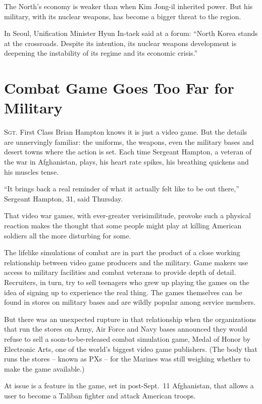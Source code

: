 ﻿\documentclass[12pt]{article}
\begin{document}
The North's economy is weaker than when Kim Jong-il inherited power. But his military, with its
nuclear weapons, has become a bigger threat to the region.

In Seoul, Unification Minister Hyun In-taek said at a forum: ``North Korea stands at the crossroads.
Despite its intention, its nuclear weapons development is deepening the instability of its regime
and its economic crisis.''

\pagebreak
\section{Combat Game Goes Too Far for Military}

\lettrine{S}{gt}. First Class Brian Hampton knows it is just a video game.
But the details are unnervingly familiar: the uniforms, the weapons, even the military bases and
desert towns where the action is set. Each time Sergeant Hampton, a veteran of the war in
Afghanistan, plays, his heart rate spikes, his breathing quickens and his muscles tense.

``It brings back a real reminder of what it actually felt like to be out there,'' Sergeant Hampton,
31, said Thursday.

That video war games, with ever-greater verisimilitude, provoke such a physical reaction makes the
thought that some people might play at killing American soldiers all the more disturbing for some.

The lifelike simulations of combat are in part the product of a close working relationship between
video game producers and the military. Game makers use access to military facilities and combat
veterans to provide depth of detail. Recruiters, in turn, try to sell teenagers who grew up playing
the games on the idea of signing up to experience the real thing. The games themselves can be found
in stores on military bases and are wildly popular among service members.

But there was an unexpected rupture in that relationship when the organizations that run the stores
on Army, Air Force and Navy bases announced they would refuse to sell a soon-to-be-released combat
simulation game, Medal of Honor by Electronic Arts, one of the world's biggest video game
publishers. (The body that runs the stores -- known as PXs -- for the Marines was still weighing
whether to make the game available.)

At issue is a feature in the game, set in post-Sept.~11 Afghanistan, that allows a user to become a
Taliban fighter and attack American troops.
\end{document}

